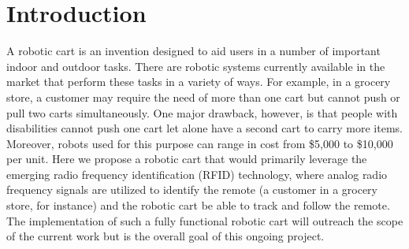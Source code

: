 \documentclass[conference]{IEEEtran}
\begin{document}
\section{Introduction}
\label{sec:introduction}

A robotic cart is an invention designed to aid users in a number of important
indoor and outdoor tasks. There are robotic systems currently available in the
market that perform these tasks in a variety of ways. For example, in a grocery
store, a customer may require the need of more than one cart but cannot push or
pull two carts simultaneously. One major drawback, however, is that people with
disabilities cannot push one cart let alone have a second cart to carry more
items. Moreover, robots used for this purpose can range in cost from \$5,000 to \$10,000 per unit. 
Here we propose a robotic cart that would primarily leverage the emerging radio
frequency identification (RFID) technology, where analog radio frequency signals
are utilized to identify the remote (a customer in a grocery store, for
instance) and the robotic cart be able to track and follow the remote. The
implementation of such a fully functional robotic cart will outreach the scope
of the current work but is the overall goal of this ongoing project. 
\end{document}
